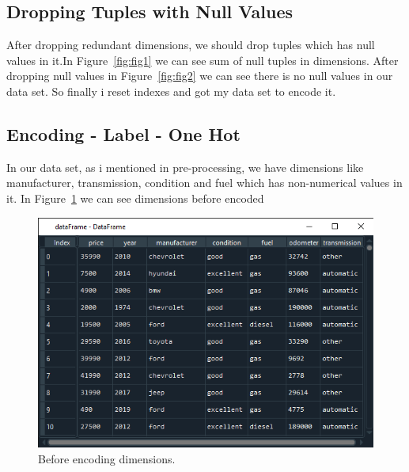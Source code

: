 \documentclass[onecolumn]{article}
\begin{document}
\subsection{Dropping Tuples with Null Values} 
After dropping redundant dimensions, we should drop tuples which has null values in it.In Figure~\ref{fig:fig1} we can see sum of null tuples in dimensions. After dropping null values in Figure~\ref{fig:fig2} we can see there is no null values in our data set. So finally i reset indexes and got my data set to encode it.

\begin{figure}[H]
\centering
{}
\caption{}
\end{figure}


\subsection{Encoding - Label - One Hot}
In our data set, as i mentioned in pre-processing, we have dimensions like manufacturer, transmission, condition and fuel which has non-numerical values in it. In Figure~\ref{fig:fig4} we can see dimensions before encoded

\begin{figure}[H]
\centering
    \includegraphics[width=.7\linewidth]{figures/Figure4.png}
\caption{\label{fig:fig4} Before encoding dimensions.}
\end{figure}
\end{document}
